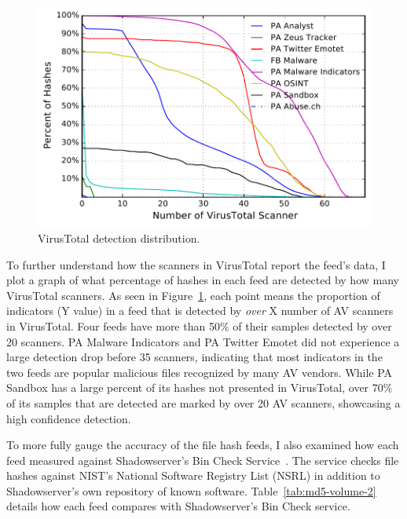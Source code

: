 \begin{figure}[t]
\includegraphics[width=0.8\columnwidth]{data_character/images/hash_vt_cdf.pdf}
\caption{VirusTotal detection distribution.}
\label{fig:vt-cdf}
\end{figure}

To further understand how the scanners in VirusTotal report the feed's data,
I plot a graph of what percentage of hashes in each feed are detected by how many
VirusTotal scanners. As seen in Figure~\ref{fig:vt-cdf}, each point means the proportion of indicators (Y value) in a feed that is detected by \textit{over} X number of AV scanners in VirusTotal. Four feeds have more
than 50\% of their samples detected by over 20 scanners. PA Malware Indicators
and PA Twitter Emotet did not experience a large detection drop before 35 scanners,
indicating that most indicators in the two feeds are popular malicious files
recognized by many AV vendors. While PA Sandbox has a large percent of its hashes
not presented in VirusTotal, over 70\% of its samples that are detected are marked
by over 20 AV scanners, showcasing a high confidence detection.


To more fully gauge the accuracy of the file hash feeds,
I also examined how each feed measured against Shadowserver's Bin Check
Service~\cite{shadowserver}. The service checks file hashes against NIST's
National Software Registry List (NSRL) in addition to Shadowserver's own repository of
known software. Table~\ref{tab:md5-volume-2} details how each feed compares with
Shadowserver's Bin Check service.

